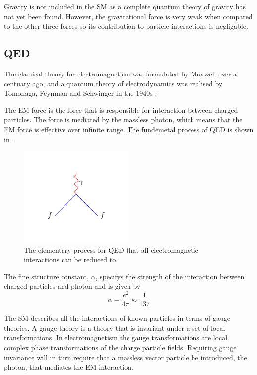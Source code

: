 Gravity is not included in the {SM} as a complete quantum theory of gravity
has not yet been found. However, the gravitational force is very weak when
compared to the other three forces so its contribution to particle interactions
is negligable.

\subsection{QED}
The classical theory for electromagnetism was formulated by Maxwell over a
centuary ago\cite{maxwell}, and a quantum theory of electrodynamics was
realised by Tomonaga, Feynman and Schwinger in the 1940s \cite{qed}.

The {EM} force is the force that is responsible for interaction between
charged particles. The force is mediated by the massless photon, which means
that the {EM} force is effective over infinite range.
The fundemetal process of {QED} is shown in .
\begin{figure}[htbp]
  \centering
  \includegraphics[width=0.5\textwidth]{qed_process}
  \caption{The elementary process for {QED} that all electromagnetic
interactions can be reduced to.}
  \label{fig:qed}
\end{figure}

The fine structure constant, $\alpha$, specifys the strength of the interaction
between charged particles and photon and is given by
\begin{equation}
\alpha = \frac{e^2}{4 \pi} \approx \frac{1}{137}
\end{equation}

The {SM} describes all the interactions of known particles in terms of gauge
theories. A gauge theory is a theory that is invariant under a set of local
transformations.  In electromagnetism the gauge transformations are local
complex phase transformations of the charge particle fields. Requiring gauge
invariance will in turn require that a massless vector particle be introduced,
the photon, that mediates the {EM} interaction.

